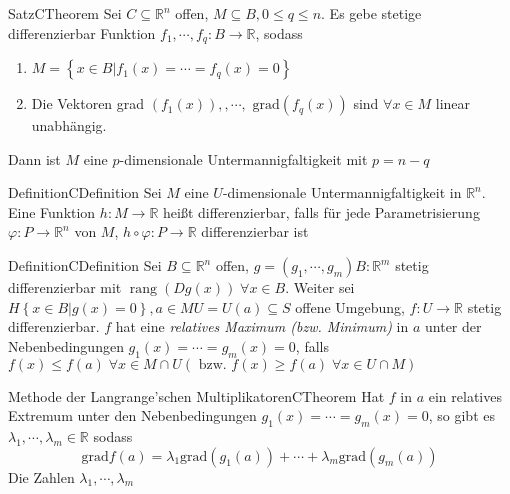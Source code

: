 \begin{ibox}[51]{Satz}{CTheorem}
    Sei $ C \subseteq \mathbb{R}^n  $ offen, $ M \subseteq B, 0 \leq q \leq n $. Es gebe stetige differenzierbar Funktion 
		$ f_1 , \cdots,  f_{q}: B \to \mathbb{R}  $, sodass 
		\begin{enumerate}
			\item $ M = \left\{ x \in B | f_1 (x)  = \cdots = f_{q} (x)  = 0 \right\}  $ 
			\item Die Vektoren grad $ \left( f_1 (x)  \right) , , \cdots, \text{ grad} \left( f_{q} (x)  \right)   $ sind $ \forall x \in M $ 
				linear unabhängig.
		\end{enumerate}
	Dann ist $ M $ eine $ p$-dimensionale Untermannigfaltigkeit mit $ p = n -q $ 	
\end{ibox}
\begin{ibox}[]{Definition}{CDefinition}
    Sei $ M $ eine $ U $-dimensionale Untermannigfaltigkeit in $ \mathbb{R}^n $. Eine Funktion $ h : M \to \mathbb{R} $ heißt 
		differenzierbar, falls für jede Parametrisierung $ \varphi : P \to \mathbb{R}^n $ von $ M $, $ h \circ \varphi : P \to \mathbb{R} $ 
		differenzierbar ist
\end{ibox}

\begin{ibox}[]{Definition}{CDefinition}
    Sei $ B \subseteq \mathbb{R}^n $ offen, $ g = \left( g_1 , \cdots,  g_{m} \right) B : \mathbb{R}^m $ stetig differenzierbar mit 
		$ \operatorname{rang} \left( Dg (x)  \right) \; \forall x \in B $. Weiter sei $ H \left\{ x \in B | g (x)  = 0\right\}, a \in M  
		U = U (a) \subseteq S$ offene Umgebung, $ f: U \to \mathbb{R} $ stetig differenzierbar. $ f $ hat eine \textit{relatives Maximum (bzw.
		Minimum)} in $ a $ unter der Nebenbedingungen $ g_1 (x)  = \cdots = g_{m} (x)  = 0 	$, falls $ f (x) \leq f (a) \; \forall x 
		\in M \cap U  (\text{ bzw. } f (x) \geq f (a) \; \forall x \in U \cap M ) $ 

\end{ibox}

\begin{ibox}[52]{Methode der Langrange'schen Multiplikatoren}{CTheorem}
   Hat $ f $ in $ a $ ein relatives Extremum unter den Nebenbedingungen $ g_1 (x)  = \cdots = g_{m} (x)  = 0 $, so gibt es 
	 $ \lambda_1 , \cdots,  \lambda_m \in \mathbb{R}  $ sodass 
	 \begin{equation}
		 \text{grad} f (a) = \lambda_1 \text{grad} (g_1 (a) ) + \cdots + \lambda_m \text{grad} (g_m (a) )
		 \tag{$\star$}
	 \end{equation}
	Die Zahlen $ \lambda_1 , \cdots,  \lambda_{m} $  
\end{ibox}

%
